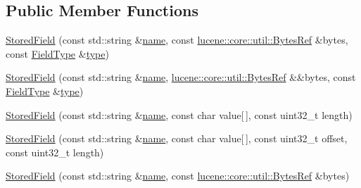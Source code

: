 \subsection*{Public Member Functions}
\begin{DoxyCompactItemize}
\item 
\mbox{\hyperlink{classlucene_1_1core_1_1document_1_1StoredField_a0a4b22c3f5bc1760d3d1b38d37d583cf}{Stored\+Field}} (const std\+::string \&\mbox{\hyperlink{classlucene_1_1core_1_1document_1_1Field_a52f673f3b3abb14b180f5159f4726537}{name}}, const \mbox{\hyperlink{classlucene_1_1core_1_1util_1_1BytesRef}{lucene\+::core\+::util\+::\+Bytes\+Ref}} \&bytes, const \mbox{\hyperlink{classlucene_1_1core_1_1document_1_1FieldType}{Field\+Type}} \&\mbox{\hyperlink{classlucene_1_1core_1_1document_1_1Field_a7d5849d933ebde73422710069643ccff}{type}})
\item 
\mbox{\hyperlink{classlucene_1_1core_1_1document_1_1StoredField_a446cec91e91723b05e371140a08cf398}{Stored\+Field}} (const std\+::string \&\mbox{\hyperlink{classlucene_1_1core_1_1document_1_1Field_a52f673f3b3abb14b180f5159f4726537}{name}}, \mbox{\hyperlink{classlucene_1_1core_1_1util_1_1BytesRef}{lucene\+::core\+::util\+::\+Bytes\+Ref}} \&\&bytes, const \mbox{\hyperlink{classlucene_1_1core_1_1document_1_1FieldType}{Field\+Type}} \&\mbox{\hyperlink{classlucene_1_1core_1_1document_1_1Field_a7d5849d933ebde73422710069643ccff}{type}})
\item 
\mbox{\hyperlink{classlucene_1_1core_1_1document_1_1StoredField_a774eb073a787738a115ddf94a38422e1}{Stored\+Field}} (const std\+::string \&\mbox{\hyperlink{classlucene_1_1core_1_1document_1_1Field_a52f673f3b3abb14b180f5159f4726537}{name}}, const char value\mbox{[}$\,$\mbox{]}, const uint32\+\_\+t length)
\item 
\mbox{\hyperlink{classlucene_1_1core_1_1document_1_1StoredField_ae9dd4a50774ddce60299b028fbcab5a9}{Stored\+Field}} (const std\+::string \&\mbox{\hyperlink{classlucene_1_1core_1_1document_1_1Field_a52f673f3b3abb14b180f5159f4726537}{name}}, const char value\mbox{[}$\,$\mbox{]}, const uint32\+\_\+t offset, const uint32\+\_\+t length)
\item 
\mbox{\hyperlink{classlucene_1_1core_1_1document_1_1StoredField_a1ba2644316f53aaafc62325bf5c1ac91}{Stored\+Field}} (const std\+::string \&\mbox{\hyperlink{classlucene_1_1core_1_1document_1_1Field_a52f673f3b3abb14b180f5159f4726537}{name}}, const \mbox{\hyperlink{classlucene_1_1core_1_1util_1_1BytesRef}{lucene\+::core\+::util\+::\+Bytes\+Ref}} \&bytes)
\item 

\end{DoxyCompactItemize}
